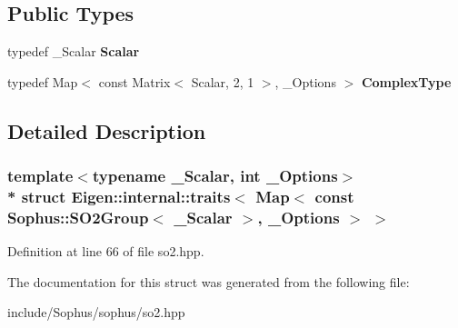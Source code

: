\subsection*{Public Types}
\begin{DoxyCompactItemize}
\item 
typedef \+\_\+\+Scalar {\bfseries Scalar}\hypertarget{struct_eigen_1_1internal_1_1traits_3_01_map_3_01const_01_sophus_1_1_s_o2_group_3_01___scalar_01_4_00_01___options_01_4_01_4_a4824c3f0c34ba642e1d6443d2374b04f}{}\label{struct_eigen_1_1internal_1_1traits_3_01_map_3_01const_01_sophus_1_1_s_o2_group_3_01___scalar_01_4_00_01___options_01_4_01_4_a4824c3f0c34ba642e1d6443d2374b04f}

\item 
typedef Map$<$ const Matrix$<$ Scalar, 2, 1 $>$, \+\_\+\+Options $>$ {\bfseries Complex\+Type}\hypertarget{struct_eigen_1_1internal_1_1traits_3_01_map_3_01const_01_sophus_1_1_s_o2_group_3_01___scalar_01_4_00_01___options_01_4_01_4_ab4466e39ebed24f825f123878f28a77d}{}\label{struct_eigen_1_1internal_1_1traits_3_01_map_3_01const_01_sophus_1_1_s_o2_group_3_01___scalar_01_4_00_01___options_01_4_01_4_ab4466e39ebed24f825f123878f28a77d}

\end{DoxyCompactItemize}


\subsection{Detailed Description}
\subsubsection*{template$<$typename \+\_\+\+Scalar, int \+\_\+\+Options$>$\\*
struct Eigen\+::internal\+::traits$<$ Map$<$ const Sophus\+::\+S\+O2\+Group$<$ \+\_\+\+Scalar $>$, \+\_\+\+Options $>$ $>$}



Definition at line 66 of file so2.\+hpp.



The documentation for this struct was generated from the following file\+:\begin{DoxyCompactItemize}
\item 
include/\+Sophus/sophus/so2.\+hpp\end{DoxyCompactItemize}
